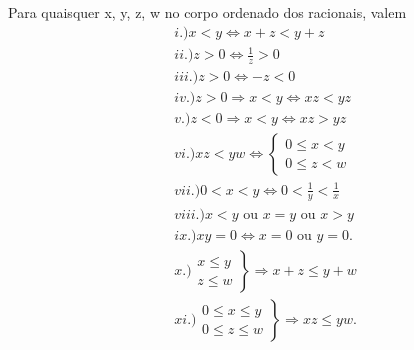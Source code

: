 \documentclass[analysis_notes.tex]{subfiles}
\begin{document}
\begin{prop*}
	Para quaisquer x, y, z, w no corpo ordenado dos racionais, valem
	\begin{align*}
		 & i.) x < y\Longleftrightarrow x + z < y + z                       \\
		 & ii.) z > 0\Longleftrightarrow \frac{1}{z} > 0                    \\
		 & iii.) z > 0\Longleftrightarrow -z < 0                            \\
		 & iv.) z > 0\Rightarrow x < y\Longleftrightarrow xz < yz           \\
		 & v.) z < 0\Rightarrow x < y\Longleftrightarrow xz > yz            \\
		 & vi.) xz < yw\Longleftrightarrow \left\{\begin{array}{ll}
			                                          0 \leq{x} < y \\
			                                          0 \leq{z} < w
		                                          \end{array}\right.        \\
		 & vii.) 0 < x < y\Longleftrightarrow 0 < \frac{1}{y} < \frac{1}{x} \\
		 & viii.) x < y \text{ ou } x =y \text{ ou } x > y                  \\
		 & ix.) xy = 0\Longleftrightarrow x = 0\text{ ou }y = 0.            \\
		 & x.) \left.\begin{array}{ll}
			             x \leq{y} \\
			             z \leq{w}
		             \end{array}\right\}\Rightarrow x + z \leq{y + w}       \\
		 & xi.) \left.\begin{array}{ll}
			              0 \leq{x} \leq{y} \\
			              0 \leq{z} \leq{w}
		              \end{array}\right\}\Rightarrow xz \leq{yw}.
	\end{align*}
\end{prop*}
\end{document}
